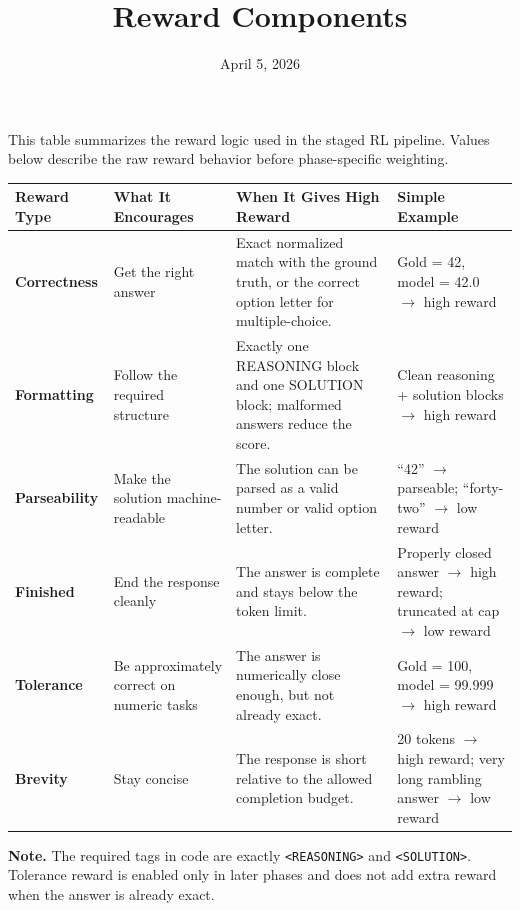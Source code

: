 \documentclass[11pt]{article}
\title{Reward Components}
\author{}
\date{April 5, 2026}
\begin{document}
\maketitle
\thispagestyle{empty}

\noindent
This table summarizes the reward logic used in the staged RL pipeline. Values below describe the raw reward behavior before phase-specific weighting.

\vspace{0.8em}

\small
\setlength{\tabcolsep}{5pt}
\renewcommand{\arraystretch}{1.25}

\begin{tabularx}{\linewidth}{L{2.4cm} L{3.0cm} Y L{4.1cm}}
\toprule
\textbf{Reward Type} & \textbf{What It Encourages} & \textbf{When It Gives High Reward} & \textbf{Simple Example} \\
\midrule

\textbf{Correctness}
& Get the right answer
& Exact normalized match with the ground truth, or the correct option letter for multiple-choice.
& Gold = 42, model = 42.0 $\rightarrow$ high reward \\

\textbf{Formatting}
& Follow the required structure
& Exactly one REASONING block and one SOLUTION block; malformed answers reduce the score.
& Clean reasoning + solution blocks $\rightarrow$ high reward \\

\textbf{Parseability}
& Make the solution machine-readable
& The solution can be parsed as a valid number or valid option letter.
& ``42'' $\rightarrow$ parseable; ``forty-two'' $\rightarrow$ low reward \\

\textbf{Finished}
& End the response cleanly
& The answer is complete and stays below the token limit.
& Properly closed answer $\rightarrow$ high reward; truncated at cap $\rightarrow$ low reward \\

\textbf{Tolerance}
& Be approximately correct on numeric tasks
& The answer is numerically close enough, but not already exact.
& Gold = 100, model = 99.999 $\rightarrow$ high reward \\

\textbf{Brevity}
& Stay concise
& The response is short relative to the allowed completion budget.
& 20 tokens $\rightarrow$ high reward; very long rambling answer $\rightarrow$ low reward \\

\bottomrule
\end{tabularx}

\vspace{0.8em}
\footnotesize
\noindent
\textbf{Note.} The required tags in code are exactly \texttt{<REASONING>} and \texttt{<SOLUTION>}. Tolerance reward is enabled only in later phases and does not add extra reward when the answer is already exact.
\end{document}
